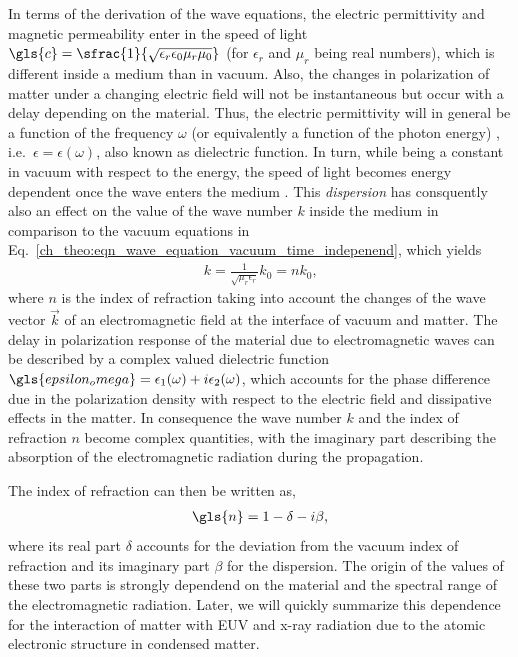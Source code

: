 In terms of the derivation of the wave equations, the electric permittivity and magnetic permeability enter in the speed of light $\gls{c} = \sfrac{1}{\sqrt{\epsilon_r \epsilon_0 \mu_r \mu_0}}$ (for $\epsilon_r$ and $\mu_r$ being real numbers), which is different inside a medium than in vacuum. Also, the changes in polarization of matter under a changing electric field will not be instantaneous but occur with a delay depending on the material. Thus, the electric permittivity will in general be a function of the frequency $\omega$ (or equivalently a function of the photon energy) , i.e.~$\epsilon = \epsilon(\omega)$, also known as dielectric function. In turn, while being a constant in vacuum with respect to the energy, the speed of light becomes energy dependent once the wave enters the medium \cite{bergevin_interaction_2009}. This \emph{dispersion} has consquently also an effect on the value of the wave number $k$ inside the medium in comparison to the vacuum equations in Eq.~\eqref{ch_theo:eqn_wave_equation_vacuum_time_indepenend}, which yields
\begin{align}
 k = \frac{1}{\sqrt{\mu_r \epsilon_r}} k_0 = n k_0\text{,} \label{ch_theo:eqn_k_inside_medium}
\end{align}
where $n$ is the index of refraction taking into account the changes of the wave vector $\vec{k}$ of an electromagnetic field at the interface of vacuum and matter. The delay in polarization response of the material due to electromagnetic waves can be described by a complex valued dielectric function $\gls{epsilon_omega} = \epsilon_1(\omega) + i \epsilon_2(\omega)$, which accounts for the phase difference due in the polarization density with respect to the electric field and dissipative effects in the matter. In consequence the wave number $k$ and the index of refraction $n$ become complex quantities, with the imaginary part describing the absorption of the electromagnetic radiation during the propagation.

The index of refraction can then be written as,
\begin{align}
\gls{n} = 1 - \delta - i \beta \text{,} \label{ch_theo:eqn_n}
\end{align}
where its real part $\delta$ accounts for the deviation from the vacuum index of refraction and its imaginary part $\beta$ for the dispersion. The origin of the values of these two parts is strongly dependend on the material and the spectral range of the electromagnetic radiation. Later, we will quickly summarize this dependence for the interaction of matter with EUV and x-ray radiation due to the atomic electronic structure in condensed matter.

